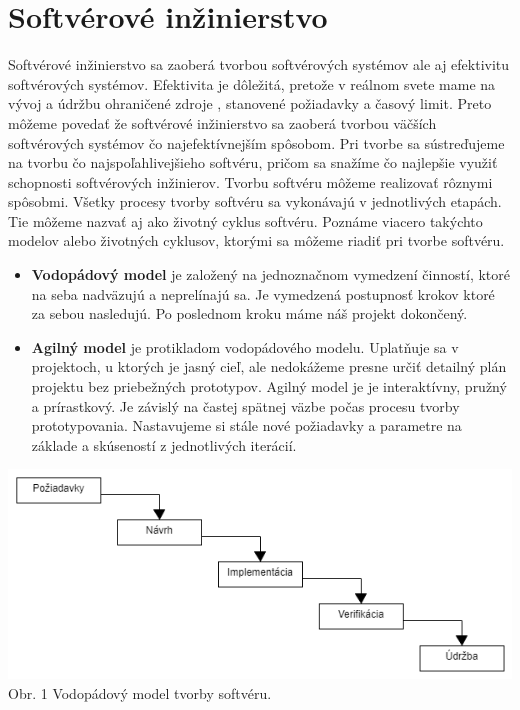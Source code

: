 \documentclass[10pt,twoside,slovak,a4paper]{article}
\begin{document}
\section{Softvérové inžinierstvo} \label{SWE}
Softvérové inžinierstvo sa zaoberá tvorbou softvérových systémov ale aj efektivitu softvérových systémov. Efektivita je dôležitá, pretože v reálnom svete mame na vývoj a údržbu ohraničené zdroje , stanovené požiadavky a časový limit. Preto môžeme povedať že softvérové inžinierstvo sa zaoberá tvorbou väčších softvérových systémov čo najefektívnejším spôsobom. Pri tvorbe sa sústreďujeme na tvorbu čo najspoľahlivejšieho softvéru, pričom sa snažíme čo najlepšie využiť schopnosti softvérových inžinierov.
Tvorbu softvéru môžeme realizovať rôznymi spôsobmi. Všetky procesy tvorby softvéru sa vykonávajú v jednotlivých etapách. Tie môžeme nazvať aj ako životný cyklus softvéru. Poznáme viacero takýchto modelov alebo životných cyklusov, ktorými sa môžeme riadiť pri tvorbe softvéru.\cite{swemb}
\begin{itemize}
    \item \textbf{Vodopádový model} je založený na jednoznačnom vymedzení činností, ktoré na seba nadväzujú a neprelínajú sa. Je vymedzená postupnosť krokov ktoré  za sebou nasledujú. Po poslednom kroku máme náš projekt dokončený.
    \item \textbf{Agilný model} je protikladom vodopádového modelu. Uplatňuje sa v projektoch, u ktorých je jasný cieľ, ale nedokážeme presne určiť detailný plán projektu bez priebežných prototypov. Agilný model je je interaktívny, pružný a prírastkový. Je závislý na častej spätnej väzbe počas procesu tvorby  prototypovania. Nastavujeme si stále nové požiadavky a parametre na základe a skúseností z jednotlivých iterácií. 
\end{itemize}
\cite{swemb}
\begin{center}
\includegraphics[scale=0.6]{vodopad1}
Obr. 1 Vodopádový model tvorby softvéru.
\end{center}
\end{document}
